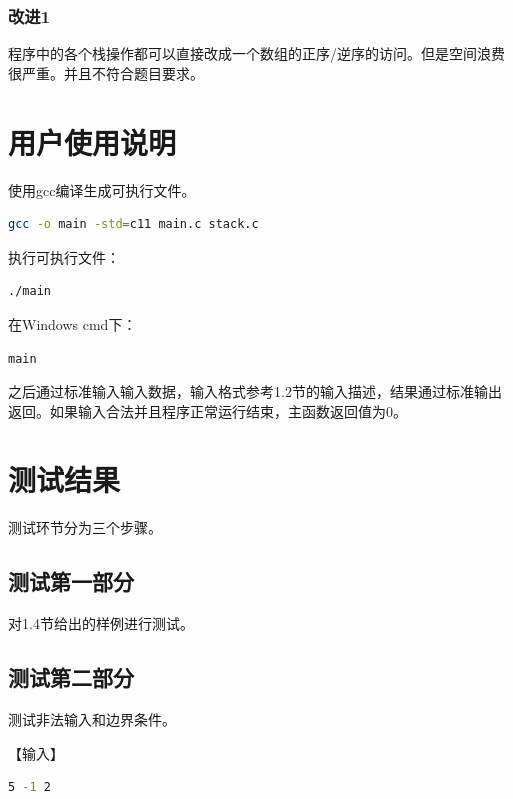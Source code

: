 \documentclass{article}
\begin{document}
\subsubsection{改进1}

程序中的各个栈操作都可以直接改成一个数组的正序/逆序的访问。但是空间浪费很严重。并且不符合题目要求。

\section{用户使用说明}

使用gcc编译生成可执行文件。

\begin{lstlisting}[language={bash},
    basicstyle=\small\consolas]
gcc -o main -std=c11 main.c stack.c
\end{lstlisting}

执行可执行文件：

\begin{lstlisting}[language={bash},
    basicstyle=\small\consolas]
./main
\end{lstlisting}

在Windows cmd下：

\begin{lstlisting}[language={bash},
    basicstyle=\small\consolas]
main
\end{lstlisting}

之后通过标准输入输入数据，输入格式参考1.2节的输入描述，结果通过标准输出返回。如果输入合法并且程序正常运行结束，主函数返回值为0。

\section{测试结果}

测试环节分为三个步骤。

\subsection{测试第一部分}

对1.4节给出的样例进行测试。

\subsection{测试第二部分}

测试非法输入和边界条件。

【输入】

\begin{lstlisting}[language={bash},
    basicstyle=\small\consolas]
5 -1 2
\end{lstlisting}
\end{document}
